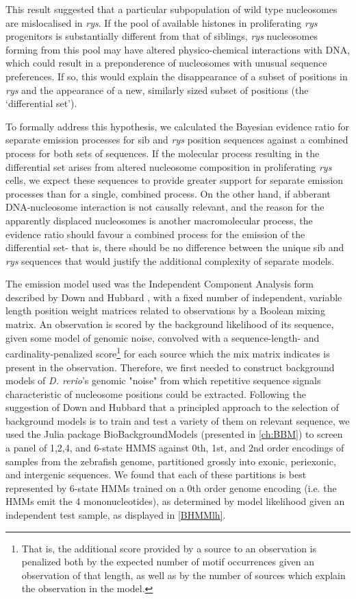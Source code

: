 This result suggested that a particular subpopulation of wild type nucleosomes are mislocalised in \textit{rys}. If the pool of available histones in proliferating \textit{rys} progenitors is substantially different from that of siblings, \textit{rys} nucleosomes forming from this pool may have altered physico-chemical interactions with DNA, which could result in a preponderence of nucleosomes with unusual sequence preferences. If so, this would explain the disappearance of a subset of positions in \textit{rys} and the appearance of a new, similarly sized subset of positions (the `differential set').

To formally address this hypothesis, we calculated the Bayesian evidence ratio for separate emission processes for sib and \textit{rys} position sequences against a combined process for both sets of sequences. If the molecular process resulting in the differential set arises from altered nucleosome composition in proliferating \textit{rys} cells, we expect these sequences to provide greater support for separate emission processes than for a single, combined process. On the other hand, if abberant DNA-nucleosome interaction is not causally relevant, and the reason for the apparently displaced nucleosomes is another macromolecular process, the evidence ratio should favour a combined process for the emission of the differential set- that is, there should be no difference between the unique sib and \textit{rys} sequences that would justify the additional complexity of separate models.

The emission model used was the Independent Component Analysis form described by Down and Hubbard \cite{Down2005}, with a fixed number of independent, variable length position weight matrices related to observations by a Boolean mixing matrix. An observation is scored by the background likelihood of its sequence, given some model of genomic noise, convolved with a sequence-length- and cardinality-penalized score\footnote{That is, the additional score provided by a source to an observation is penalized both by the expected number of motif occurrences given an observation of that length, as well as by the number of sources which explain the observation in the model.} for each source which the mix matrix indicates is present in the observation. Therefore, we first needed to construct background models of \textit{D. rerio}'s genomic "noise" from which repetitive sequence signals characteristic of nucleosome positions could be extracted. Following the suggestion of Down and Hubbard \cite{Down2005} that a principled approach to the selection of background models is to train and test a variety of them on relevant sequence, we used the Julia package BioBackgroundModels (presented in \autoref{ch:BBM}) to screen a panel of 1,2,4, and 6-state HMMS against  0th, 1st, and 2nd order encodings of samples from the zebrafish genome, partitioned grossly into exonic, periexonic, and intergenic sequences. We found that each of these partitions is best represented by 6-state HMMs trained on a 0th order genome encoding (i.e. the HMMs emit the 4 mononucleotides), as determined by model likelihood given an independent test sample, as displayed in \autoref{BHMMlh}.

